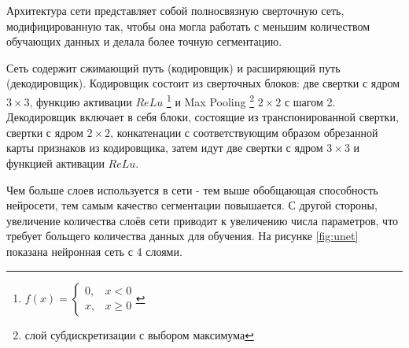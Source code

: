 \newline
\par
Архитектура сети представляет собой полносвязную сверточную сеть, модифицированную так, чтобы она могла работать с меньшим количеством обучающих данных и делала более точную сегментацию. \par
Сеть содержит сжимающий путь (кодировщик) и расширяющий путь (декодировщик). Кодировщик состоит из сверточных блоков: две свертки с ядром $3 \times 3$, функцию активации $ReLu$ \footnote {$f(x)=\begin{cases} 0, & x<0 \\ x, & x \geqslant 0 \end{cases}$} и Max Pooling \footnote {слой субдискретизации с выбором максимума} $2 \times 2$ с шагом 2.
Декодировщик включает в себя блоки, состоящие из транспонированной свертки, свертки с ядром $2 \times 2$, конкатенации с соответствующим образом обрезанной карты признаков из кодировщика, затем идут две свертки с ядром $3 \times 3$ и функцией активации $ReLu$.  

\par Чем больше слоев используется в сети - тем выше обобщающая способность нейросети, тем самым качество сегментации повышается. С другой стороны, увеличение количества слоёв сети приводит к увеличению числа параметров, что требует больщего количества данных для обучения. На рисунке \ref{fig:unet} показана нейронная сеть с 4 слоями.

\newpage
